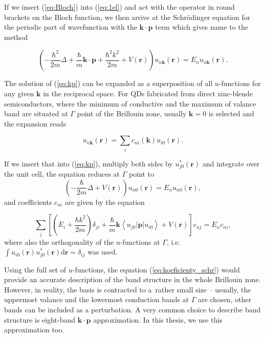 If we insert (\ref{eq:Bloch}) into (\ref{eq:1el}) and act with the operator in round brackets on the Bloch function, we then arrive at the Schrödinger equation for the periodic part of wavefunction with the $\mathbf{k}\cdot\mathbf{p}$ term which gives name to the method

\begin{equation}
\left(-\frac{\hbar^2}{2m}\Delta+\frac{\hbar}{m}\mathbf{k}\cdot\mathbf{p}+\frac{\hbar^2 k^2}{2m}+V(\mathbf{r})\right)u_{n\mathbf{k}}(\mathbf{r})=E_nu_{n\mathbf{k}}(\mathbf{r}). \label{eq:kp}
\end{equation}

The solution of (\ref{eq:kp}) can be expanded as a superposition of all $u$-functions for any given $\mathbf{k}$ in the reciprocal space. For QDs fabricated from direct zinc-blende semiconductors, where the minimum of conductive and the maximum of valance band are situated at $\Gamma$ point of the Brillouin zone, usually $\mathbf{k}=0$ is selected and the expansion reads

\begin{equation}
\label{eqBlochSuper}
u_{n\mathbf{k}}(\mathbf{r})=\sum_i c_{ni}(\mathbf{k}) u_{i0}(\mathbf{r}).
\end{equation}

If we insert that into (\ref{eq:kp}), multiply both sides by $u_{j0}^*(\mathbf{r})$ and integrate over the unit cell, the equation reduces at $\Gamma$ point to 
\begin{equation}
\left(-\frac{\hbar}{2m}\Delta+V(\mathbf{r})\right)u_{n0}(\mathbf{r})=E_nu_{n0}(\mathbf{r}),
\end{equation}
and coefficients $c_{ni}$ are given by the equation

\begin{equation}
\sum_j\left[\left(E_i+\frac{\hbar k^2}{2m}\right) \delta_{ji}+\frac{\hbar}{m}\mathbf{k}\left<u_{j0}|\mathbf{p}|u_{i0}\right> +V(\mathbf{r}) \right]c_{nj}=E_nc_{ni}, \label{eq:koeficienty_schr}
\end{equation}
where also the orthogonality of the $u$-functions at $\Gamma$, i.e.~$\int u_{i0}(\mathbf{r})u_{j0}^*(\mathbf{r})\mathrm{d}\mathbf{r}=\delta_{ij}$ was used.

Using the full set of $u$-functions, the equation (\ref{eq:koeficienty_schr}) would provide an accurate description of the band structure in the whole Brillouin zone. However, in reality, the basis is contracted to a~rather small size -- usually, the uppermost valance and the lowermost conduction bands at $\Gamma$ are chosen, other bands can be included as a perturbation. A very common choice to describe band structure is eight-band $\mathbf{k\cdot p}$ approximation. In this thesis, we use this approximation too.

